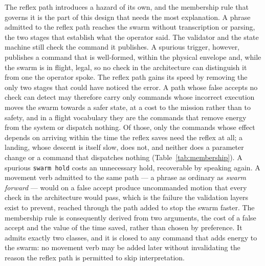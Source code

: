 The reflex path introduces a hazard of its own, and the membership rule that governs it is the
part of this design that needs the most explanation. A phrase admitted to the reflex path reaches
the swarm without transcription or parsing, the two stages that establish what the operator said.
The validator and the state machine still check the command it publishes. A spurious trigger,
however, publishes a command that is well-formed, within the physical envelope and, while the swarm
is in flight, legal, so no check in the architecture can distinguish it from one the operator
spoke. The reflex path gains its speed by removing the only two stages that could have noticed the
error. A path whose false accepts no check can detect may therefore carry only commands whose
incorrect execution moves the swarm towards a safer state, at a cost to the mission rather than to
safety, and in a flight vocabulary they are the commands that remove energy from the system or
dispatch nothing. Of those, only the commands whose effect depends on arriving within the time the
reflex saves need the reflex at all; a landing, whose descent is itself slow, does not, and neither
does a parameter change or a command that dispatches nothing (Table~\ref{tab:membership}). A
spurious \texttt{swarm hold} costs an unnecessary hold, recoverable by speaking again. A movement
verb admitted to the same path --- a phrase as ordinary as \emph{swarm forward} --- would on a false
accept produce uncommanded motion that every check in the architecture would pass, which is the
failure the validation layers exist to prevent, reached through the path added to stop the swarm
faster. The membership rule is consequently derived from two arguments, the cost of a false accept
and the value of the time saved, rather than chosen by preference. It admits exactly two classes,
and it is closed to any command that adds energy to the swarm: no movement verb may be added later
without invalidating the reason the reflex path is permitted to skip interpretation.

